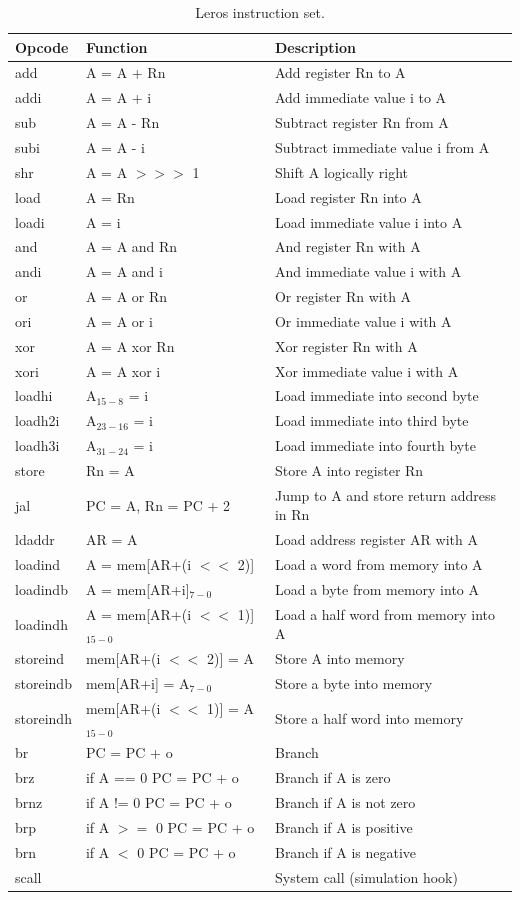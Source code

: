 \documentclass[%
    10pt,
    headinclude, footexclude,
    openright, %
    notitlepage,
    cleardoubleempty,
    headsepline,
    pointlessnumbers,
    bibtotoc, idxtotoc,
    ]{scrbook}
\begin{document}
\begin{table}
\centering
\begin{tabular}{lll}
\toprule
Opcode & Function & Description\\
\midrule
add & A = A + Rn & Add register Rn to A \\
addi & A = A + i & Add immediate value i to A \\
sub & A = A - Rn & Subtract register Rn from A \\
subi & A = A - i & Subtract immediate value i from A \\
shr & A = A $>>>$ 1 & Shift A logically right \\
load & A = Rn & Load register Rn into A \\
loadi & A = i & Load immediate value i into A \\
and & A = A and Rn & And register Rn with A \\
andi & A = A and i & And immediate value i with A \\
or & A = A or Rn & Or register Rn with A \\
ori & A = A or i & Or immediate value i with A \\
xor & A = A xor Rn & Xor register Rn with A \\
xori & A = A xor i & Xor immediate value i with A \\
loadhi & A$_{15-8}$ = i & Load immediate into second byte \\
loadh2i & A$_{23-16}$ = i  & Load immediate into third byte \\
loadh3i & A$_{31-24}$ = i & Load immediate into fourth byte \\
store & Rn = A & Store A into register Rn \\
jal & PC = A, Rn = PC + 2 & Jump to A and store return address in Rn \\
ldaddr & AR = A & Load address register AR with A \\
loadind & A = mem[AR+(i $<<$ 2)] & Load a word from memory into A \\
loadindb & A = mem[AR+i]$_{7-0}$  &  Load a byte from memory into A\\
loadindh & A = mem[AR+(i $<<$ 1)]$_{15-0}$  &  Load a half word from memory into A\\
storeind & mem[AR+(i $<<$ 2)] = A & Store A into memory \\
storeindb & mem[AR+i] = A$_{7-0}$ & Store a byte into memory \\
storeindh & mem[AR+(i $<<$ 1)] = A$_{15-0}$ & Store a half word into memory \\
br & PC = PC + o & Branch \\
brz & if A == 0 PC = PC + o & Branch if A is zero \\
brnz & if A != 0 PC = PC + o  & Branch if A is not zero \\
brp & if A $>=$ 0 PC = PC + o & Branch if A is positive \\
brn & if A $<$ 0 PC = PC + o & Branch if A is negative \\
scall &  & System call (simulation hook) \\
\bottomrule
\end{tabular}
\caption{Leros instruction set.}
\label{tab:leros:isa}
\end{table}
\end{document}
